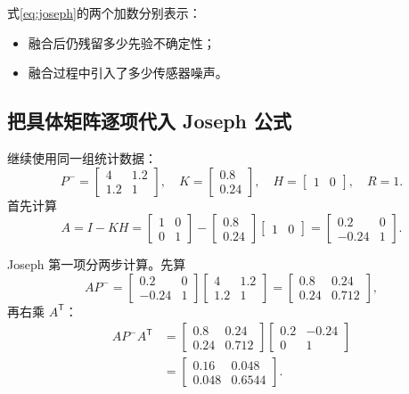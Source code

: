 \documentclass[UTF8,a4paper,11pt]{ctexart}
\newcommand{\prior}{^{-}}
\newcommand{\transpose}{^{\mathsf T}}
\begin{document}
式\eqref{eq:joseph}的两个加数分别表示：
\begin{itemize}
\item 融合后仍残留多少先验不确定性；
\item 融合过程中引入了多少传感器噪声。
\end{itemize}

\subsection{把具体矩阵逐项代入 Joseph 公式}

继续使用同一组统计数据：
\begin{equation}
P\prior=\begin{bmatrix}4&1.2\\1.2&1\end{bmatrix},\quad
K=\begin{bmatrix}0.8\\0.24\end{bmatrix},\quad
H=\begin{bmatrix}1&0\end{bmatrix},\quad R=1.
\end{equation}
首先计算
\begin{equation}
A=I-KH
=\begin{bmatrix}1&0\\0&1\end{bmatrix}
-\begin{bmatrix}0.8\\0.24\end{bmatrix}
\begin{bmatrix}1&0\end{bmatrix}
=\begin{bmatrix}0.2&0\\-0.24&1\end{bmatrix}.
\end{equation}

Joseph 第一项分两步计算。先算
\begin{equation}
AP\prior
=\begin{bmatrix}0.2&0\\-0.24&1\end{bmatrix}
\begin{bmatrix}4&1.2\\1.2&1\end{bmatrix}
=\begin{bmatrix}0.8&0.24\\0.24&0.712\end{bmatrix},
\end{equation}
再右乘 $A\transpose$：
\begin{align}
AP\prior A\transpose
&=\begin{bmatrix}0.8&0.24\\0.24&0.712\end{bmatrix}
\begin{bmatrix}0.2&-0.24\\0&1\end{bmatrix}\\
&=\begin{bmatrix}0.16&0.048\\0.048&0.6544\end{bmatrix}.
\end{align}
\end{document}
